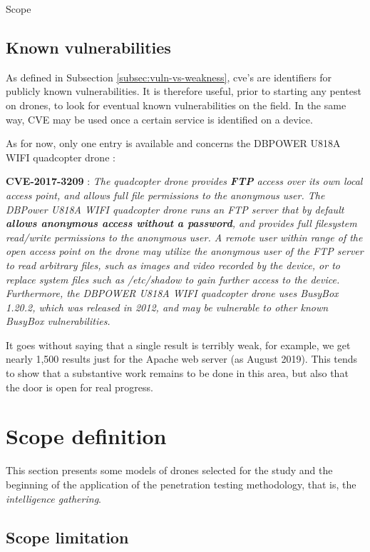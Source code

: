 \begin{chaptercover}{Scope}
\subsection{Known vulnerabilities}

As defined in Subsection \ref{subsec:vuln-vs-weakness}, \acrshort{cve}'s are identifiers for publicly known vulnerabilities. It is therefore useful, prior to starting any pentest on drones, to look for eventual known vulnerabilities on the field. In the same way, CVE may be used once a certain service is identified on a device.

As for now, only one entry is available and concerns the DBPOWER U818A WIFI quadcopter drone :
\begin{indentbox}{1cm}
  \textbf{CVE-2017-3209} : \textit{The quadcopter drone provides \textbf{FTP} access over its own local access point, and allows full file permissions to the anonymous user. The DBPower U818A WIFI quadcopter drone runs an FTP server that by default \textbf{allows anonymous access without a password}, and provides full filesystem read/write permissions to the anonymous user. A remote user within range of the open access point on the drone may utilize the anonymous user of the FTP server to read arbitrary files, such as images and video recorded by the device, or to replace system files such as /etc/shadow to gain further access to the device. Furthermore, the DBPOWER U818A WIFI quadcopter drone uses BusyBox 1.20.2, which was released in 2012, and may be vulnerable to other known BusyBox vulnerabilities.}
\end{indentbox}

It goes without saying that a single result is terribly weak, for example, we get nearly 1,500 results just for the Apache web server (as August 2019). This tends to show that a substantive work remains to be done in this area, but also that the door is open for real progress.

\section{Scope definition}

This section presents some models of drones selected for the study and the beginning of the application of the penetration testing methodology, that is, the \textit{intelligence gathering}.

\subsection{Scope limitation}


\end{chaptercover}
